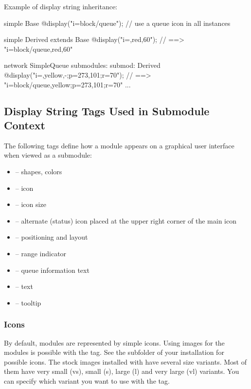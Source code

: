 Example of display string inheritance:

\begin{ned}
simple Base {
    @display("i=block/queue"); // use a queue icon in all instances
}

simple Derived extends Base {
    @display("i=,red,60");  // ==> "i=block/queue,red,60"
}

network SimpleQueue {
    submodules:
        submod: Derived {
            @display("i=,yellow,-;p=273,101;r=70");
                     // ==> "i=block/queue,yellow;p=273,101;r=70"
        }
        ...
}
\end{ned}


\subsection{Display String Tags Used in Submodule Context}

The following tags define how a module appears on a graphical user interface
when viewed as a submodule:
\begin{itemize}
  \item{ -- shapes, colors}
  \item{ -- icon}
  \item{ -- icon size}
  \item{ -- alternate (status) icon placed at the upper right corner of the main icon}
  \item{ -- positioning and layout}
  \item{ -- range indicator}
  \item{ -- queue information text}
  \item{ -- text}
  \item{ -- tooltip}
\end{itemize}

\subsubsection{Icons}

By default, modules are represented by simple icons.
Using images for the modules is possible with the  tag.
See the  subfolder of your {\opp} installation for possible
icons. The stock images installed with {\opp} have several size variants.
Most of them have very small (vs), small (s), large (l) and
very large (vl) variants. You can specify which variant you want to use with
the  tag.

